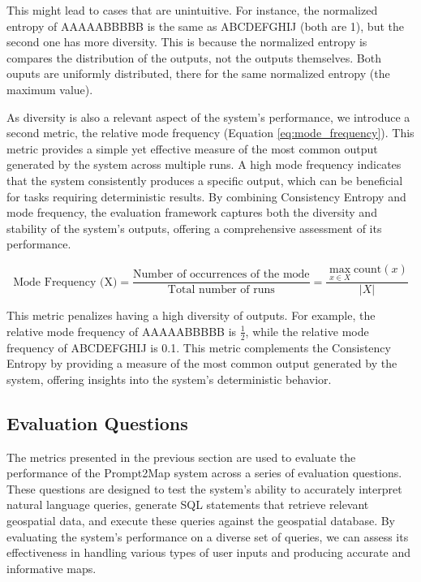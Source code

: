 This might lead to cases that are unintuitive. For instance, the normalized entropy of AAAAABBBBB is the same as ABCDEFGHIJ (both are 1), but the second one has more diversity. This is because the normalized entropy is compares the distribution of the outputs, not the outputs themselves. Both ouputs are uniformly distributed, there for the same normalized entropy (the maximum value).

As diversity is also a relevant aspect of the system's performance, we introduce a second metric, the relative mode frequency (Equation \ref{eq:mode_frequency}). This metric provides a simple yet effective measure of the most common output generated by the system across multiple runs. A high mode frequency indicates that the system consistently produces a specific output, which can be beneficial for tasks requiring deterministic results. By combining Consistency Entropy and mode frequency, the evaluation framework captures both the diversity and stability of the system's outputs, offering a comprehensive assessment of its performance.

\begin{equation}
    \text{Mode Frequency (X)} = \frac{\text{Number of occurrences of the mode}}{\text{Total number of runs}} = \frac{\max_{x \in X} \text{count}(x)}{|X|}
    \label{eq:mode_frequency}
\end{equation}


This metric penalizes having a high diversity of outputs. For example, the relative mode frequency of AAAAABBBBB is $\frac{1}{2}$, while the relative mode frequency of ABCDEFGHIJ is 0.1. This metric complements the Consistency Entropy by providing a measure of the most common output generated by the system, offering insights into the system's deterministic behavior.


\subsection{Evaluation Questions}

The metrics presented in the previous section are used to evaluate the performance of the Prompt2Map system across a series of evaluation questions. These questions are designed to test the system's ability to accurately interpret natural language queries, generate SQL statements that retrieve relevant geospatial data, and execute these queries against the geospatial database. By evaluating the system's performance on a diverse set of queries, we can assess its effectiveness in handling various types of user inputs and producing accurate and informative maps.

